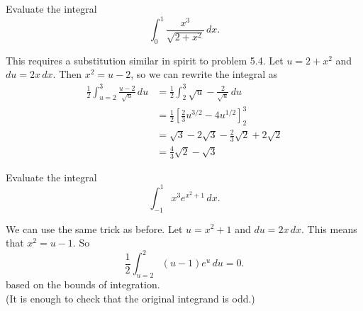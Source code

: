 \documentclass{article}
\newenvironment{problem}[2][Problem]{\begin{trivlist}
\item[\hskip \labelsep {\bfseries #1}\hskip \labelsep {\bfseries #2.}]}{\end{trivlist}}
\newenvironment{solution}[1][Solution.]{\begin{trivlist}
\item[\hskip \labelsep {\bfseries #1}]}{\end{trivlist}}
\begin{document}
\pagebreak
\begin{problem}{7}
  Evaluate the integral \[
    \int_0^1 \frac{x^3}{\sqrt{2 + x^2}}\,dx.
  \]
\end{problem}

\begin{solution} $ $\\
  This requires a substitution similar in spirit to problem 5.4.
  Let $u = 2 + x^2$ and $du = 2x\,dx$. Then $x^2 = u - 2$, so we can rewrite the
  integral as \begin{align*}
    \frac{1}{2}\int_{u=2}^3 \frac{u - 2}{\sqrt{u}}\,du
    &= \frac{1}{2}\int_2^3 \sqrt{u} - \frac{2}{\sqrt{u}}\,du \\
    &= \frac{1}{2}\left[\frac{2}{3}u^{3/2} - 4u^{1/2}\right]_2^3 \\
    &= \sqrt{3} - 2\sqrt{3} - \frac{2}{3}\sqrt{2} + 2\sqrt{2} \\
    &=  \frac{4}{3}\sqrt{2} - \sqrt{3}
  \end{align*}
\end{solution}

\begin{problem}{8}
  Evaluate the integral \[
    \int_{-1}^1 x^3e^{x^2 + 1}\, dx.
  \]
\end{problem}

\begin{solution} $ $\\
  We can use the same trick as before. Let $u = x^2 + 1$ and $du = 2x\, dx$.
  This means that $x^2 = u - 1$. So \[
    \frac{1}{2}\int_{u=2}^2 (u - 1)e^u\, du = 0.
  \] based on the bounds of integration.\\
  (It is enough to check that the original integrand is odd.)
\end{solution}
\end{document}

